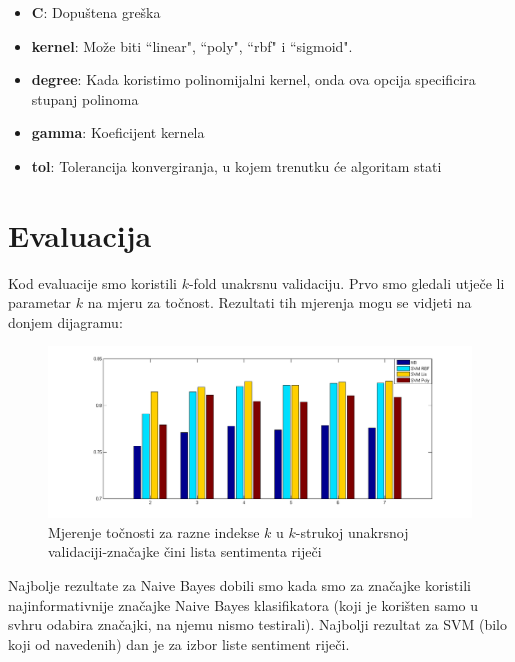 \documentclass[conference]{IEEEtran}
\begin{document}
\begin{itemize}
  \item{\textbf{C}:} Dopuštena greška
  \item{\textbf{kernel}:} Može biti ``linear", ``poly", ``rbf" i ``sigmoid".
  \item{\textbf{degree}:} Kada koristimo polinomijalni kernel, onda ova opcija
    specificira stupanj polinoma
  \item{\textbf{gamma}:} Koeficijent kernela
  \item{\textbf{tol}:} Tolerancija konvergiranja, u kojem trenutku će algoritam
    stati
\end{itemize}

\section{Evaluacija}

Kod evaluacije smo koristili $k$-fold unakrsnu validaciju. Prvo smo gledali utječe li parametar $k$ na mjeru za točnost. Rezultati tih mjerenja mogu se vidjeti  na donjem dijagramu:

\begin{figure}[!ht]
\begin{minipage}{0.5\textwidth}
\centering
\includegraphics[width=\textwidth]{images/testK-fold.png}
\caption{Mjerenje točnosti za razne indekse $k$ u $k$-strukoj unakrsnoj validaciji-značajke čini lista sentimenta riječi}
\end{minipage}
\end{figure}

Najbolje rezultate za Naive Bayes dobili smo kada smo za značajke koristili najinformativnije značajke Naive Bayes klasifikatora (koji je korišten samo u svhru odabira značajki, na njemu nismo testirali). Najbolji rezultat za SVM (bilo koji od navedenih) dan je za izbor liste sentiment riječi.
\end{document}
